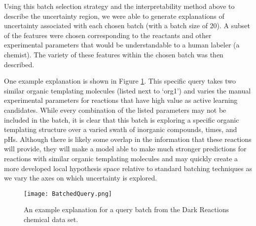 Using this batch selection strategy and the interpretability method above to describe the uncertainty region, we were able to generate explanations of uncertainty associated with each chosen batch (with a batch size of 20).  A subset of the features were chosen corresponding to the reactants and other experimental parameters that would be understandable to a human labeler (a chemist).  The variety of these features within the chosen batch was then described.

One example explanation is shown in Figure \ref{fig:drp_batch_expl}. This specific query takes two similar organic templating molecules (listed next to `org1') and varies the manual experimental parameters for reactions that have high value as active learning candidates. While  every combination of the listed parameters may not be included in the batch, it is clear that this batch is exploring a specific organic templating structure over a varied swath of inorganic compounds, times, and pHs. Although there is likely some overlap in the information that these reactions will provide, they will make a model able to make much stronger predictions for reactions with similar organic templating molecules and may quickly create a more developed local hypothesis space relative to standard batching techniques as we vary the axes on which uncertainty is explored. 

\begin{figure}[htbp]
\begin{center}
\texttt{[image: BatchedQuery.png]}
\caption{An example explanation for a query batch from the Dark Reactions chemical data set.}
\label{fig:drp_batch_expl}
\end{center}
\end{figure}








